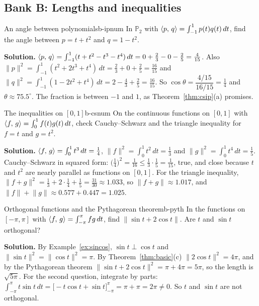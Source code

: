 \documentclass[11pt]{article}
\begin{document}
\subsection*{Bank B: Lengths and inequalities}
\begin{exmp}{An angle between polynomials}{b-ipnum}
In $\mathbb{P}_2$ with $\langle p,\,q\rangle=\int_{-1}^1p(t)q(t)\,dt$, find the angle between $p=t+t^2$ and $q=1-t^2$.

\textbf{Solution.} $\langle p,\,q\rangle=\int_{-1}^1(t+t^2-t^3-t^4)\,dt=0+\tfrac23-0-\tfrac25=\tfrac4{15}$. Also $\lVert p\rVert^2=\int_{-1}^1(t^2+2t^3+t^4)\,dt=\tfrac23+0+\tfrac25=\tfrac{16}{15}$ and $\lVert q\rVert^2=\int_{-1}^1(1-2t^2+t^4)\,dt=2-\tfrac43+\tfrac25=\tfrac{16}{15}$. So $\cos\theta=\dfrac{4/15}{16/15}=\tfrac14$ and $\theta\approx75.5^\circ$. The fraction is between $-1$ and $1$, as Theorem~\ref{thm:csip}(a) promises.
\end{exmp}

\begin{exmp}{The inequalities on $[0,1]$}{b-csnum}
On the continuous functions on $[0,1]$ with $\langle f,\,g\rangle=\int_0^1f(t)g(t)\,dt$, check Cauchy--Schwarz and the triangle inequality for $f=t$ and $g=t^2$.

\textbf{Solution.} $\langle f,\,g\rangle=\int_0^1t^3\,dt=\tfrac14$, $\lVert f\rVert^2=\int_0^1t^2\,dt=\tfrac13$ and $\lVert g\rVert^2=\int_0^1t^4\,dt=\tfrac15$. Cauchy--Schwarz in squared form: $\bigl(\tfrac14\bigr)^2=\tfrac1{16}\le\tfrac13\cdot\tfrac15=\tfrac1{15}$, true, and close because $t$ and $t^2$ are nearly parallel as functions on $[0,1]$. For the triangle inequality, $\lVert f+g\rVert^2=\tfrac13+2\cdot\tfrac14+\tfrac15=\tfrac{31}{30}\approx1.033$, so $\lVert f+g\rVert\approx1.017$, and $\lVert f\rVert+\lVert g\rVert\approx0.577+0.447=1.025$.
\end{exmp}

\begin{exmp}{Orthogonal functions and the Pythagorean theorem}{b-pyth}
In the functions on $[-\pi,\pi]$ with $\langle f,\,g\rangle=\int_{-\pi}^{\pi}fg\,dt$, find $\lVert\sin t+2\cos t\rVert$. Are $t$ and $\sin t$ orthogonal?

\textbf{Solution.} By Example~\ref{ex:sincos}, $\sin t\perp\cos t$ and $\lVert\sin t\rVert^2=\lVert\cos t\rVert^2=\pi$. By Theorem~\ref{thm:basic}(c) $\lVert2\cos t\rVert^2=4\pi$, and by the Pythagorean theorem $\lVert\sin t+2\cos t\rVert^2=\pi+4\pi=5\pi$, so the length is $\sqrt{5\pi}$. For the second question, integrate by parts: $\int_{-\pi}^{\pi}t\sin t\,dt=\bigl[-t\cos t+\sin t\bigr]_{-\pi}^{\pi}=\pi+\pi=2\pi\neq0$. So $t$ and $\sin t$ are not orthogonal.
\end{exmp}
\end{document}
